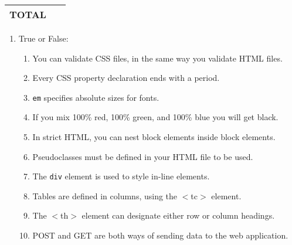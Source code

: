 {{{\begin{center}
\begin{tabular}{|c|l|}
\hspace{.05in} TOTAL \hspace{.05in} & \hspace{1in} \mbox{ }  \\ \hline \hline
\end{tabular}
\end{center}
}



\newpage



\begin{enumerate}

   \item True or False:
    \begin{enumerate}
     	\item \underline{\hspace{.25in}} You can validate CSS files, in the same way you validate HTML files.
     	\item \underline{\hspace{.25in}} Every CSS property declaration ends with a period.
     	\item \underline{\hspace{.25in}} {\tt em} specifies absolute sizes for fonts.
	\item \underline{\hspace{.25in}} If you mix 100\% red, 100\% green, and 100\% blue you will get black.
	\item \underline{\hspace{.25in}} In strict HTML, you can nest block elements inside block elements.	
	\item \underline{\hspace{.25in}} Pseudoclasses must be defined in your HTML file to be used.
	\item \underline{\hspace{.25in}} The {\tt div} element is used to style in-line elements.
	\item \underline{\hspace{.25in}} Tables are defined in columns, using the $<$tc$>$ element.
	\item \underline{\hspace{.25in}} The $<$th$>$ element can designate either row or column headings.  
	\item  \underline{\hspace{.25in}} POST and GET are both ways of sending data to the web application.
    \end{enumerate}


\end{enumerate}}}

